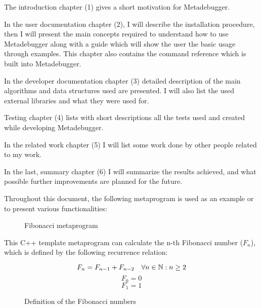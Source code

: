 The introduction chapter (1) gives a short motivation for Metadebugger.

In the user documentation chapter (2), I will describe the installation
procedure, then I will present the main concepts required to understand how to
use Metadebugger along with a guide which will show the user the basic usage
through examples. This chapter also contains the command reference which is
built into Metadebugger.

In the developer documentation chapter (3) detailed description of the main
algorithms and data structures used are presented. I will also list the used
external libraries and what they were used for.

Testing chapter (4) lists with short descriptions all the tests used and
created while developing Metadebugger.

In the related work chapter (5) I will list some work done by other people
related to my work.

In the last, summary chapter (6) I will summarize the results achieved, and
what possible further improvements are planned for the future.

Throughout this document, the following metaprogram is used as an example or to
present various functionalities:

\begin{figure}[H]
    \caption{Fibonacci metaprogram}
\end{figure}

This C++ template metaprogram can calculate the n-th Fibonacci number
(\(F_n\)), which is defined by the following recurrence relation:

\begin{figure}[H]
    \[
        F_n = F_{n-1} + F_{n-2} \quad \forall n \in \mathbb{N}: n \geq 2 \\
    \]
    \[
        F_0 = 0
    \]
    \[
        F_1 = 1
    \]
    \caption{Definition of the Fibonacci numbers}
\end{figure}
